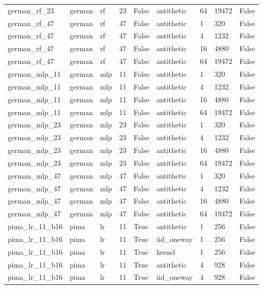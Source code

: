 \begin{tabular}{lllllllll}
german\_rf\_23 & german & rf & 23 & False & antithetic & 64 & 19472 & False \\
german\_rf\_47 & german & rf & 47 & False & antithetic & 1 & 320 & False \\
german\_rf\_47 & german & rf & 47 & False & antithetic & 4 & 1232 & False \\
german\_rf\_47 & german & rf & 47 & False & antithetic & 16 & 4880 & False \\
german\_rf\_47 & german & rf & 47 & False & antithetic & 64 & 19472 & False \\
german\_mlp\_11 & german & mlp & 11 & False & antithetic & 1 & 320 & False \\
german\_mlp\_11 & german & mlp & 11 & False & antithetic & 4 & 1232 & False \\
german\_mlp\_11 & german & mlp & 11 & False & antithetic & 16 & 4880 & False \\
german\_mlp\_11 & german & mlp & 11 & False & antithetic & 64 & 19472 & False \\
german\_mlp\_23 & german & mlp & 23 & False & antithetic & 1 & 320 & False \\
german\_mlp\_23 & german & mlp & 23 & False & antithetic & 4 & 1232 & False \\
german\_mlp\_23 & german & mlp & 23 & False & antithetic & 16 & 4880 & False \\
german\_mlp\_23 & german & mlp & 23 & False & antithetic & 64 & 19472 & False \\
german\_mlp\_47 & german & mlp & 47 & False & antithetic & 1 & 320 & False \\
german\_mlp\_47 & german & mlp & 47 & False & antithetic & 4 & 1232 & False \\
german\_mlp\_47 & german & mlp & 47 & False & antithetic & 16 & 4880 & False \\
german\_mlp\_47 & german & mlp & 47 & False & antithetic & 64 & 19472 & False \\
pima\_lr\_11\_b16 & pima & lr & 11 & True & antithetic & 1 & 256 & False \\
pima\_lr\_11\_b16 & pima & lr & 11 & True & iid\_oneway & 1 & 256 & False \\
pima\_lr\_11\_b16 & pima & lr & 11 & True & kernel & 1 & 256 & False \\
pima\_lr\_11\_b16 & pima & lr & 11 & True & antithetic & 4 & 928 & False \\
pima\_lr\_11\_b16 & pima & lr & 11 & True & iid\_oneway & 4 & 928 & False \\

\end{tabular}
